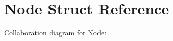 \hypertarget{structNode}{}\section{Node Struct Reference}
\label{structNode}


Collaboration diagram for Node\+:
